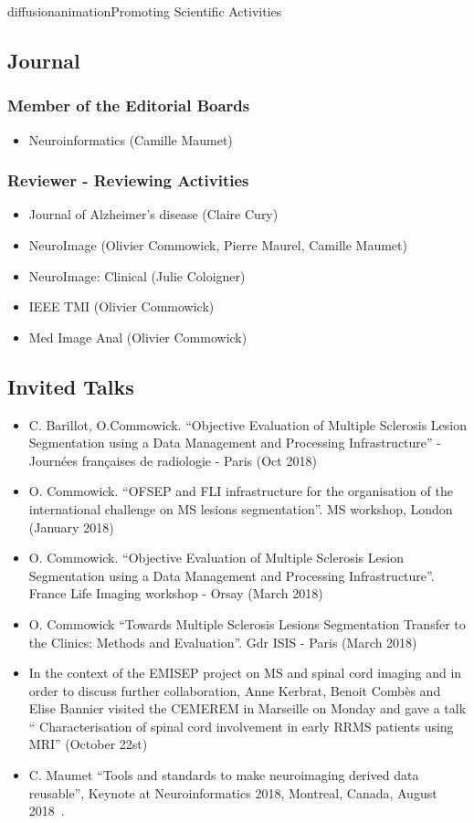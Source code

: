 \documentclass{ra2018}
\begin{document}
\begin{module}{diffusion}{animation}{Promoting Scientific Activities}
\subsection{Journal}
    \subsubsection{Member of the Editorial Boards}
    \begin{itemize}
        \item Neuroinformatics (Camille Maumet)
    \end{itemize}   
    \subsubsection{Reviewer - Reviewing Activities}
    \begin{itemize}
        \item Journal of Alzheimer's disease (Claire Cury)
        \item NeuroImage (Olivier Commowick, Pierre Maurel, Camille Maumet)
        \item NeuroImage: Clinical (Julie Coloigner)
        \item IEEE TMI (Olivier Commowick)
        \item Med Image Anal (Olivier Commowick)
    \end{itemize}    
\subsection{Invited Talks}
\begin{itemize}
    \item C. Barillot, O.Commowick. ``Objective Evaluation of Multiple Sclerosis Lesion Segmentation using a Data Management and Processing Infrastructure'' - Journées françaises de radiologie - Paris (Oct 2018)~\cite{commowick:inserm-01895603}
    \item O. Commowick. ``OFSEP and FLI infrastructure for the organisation of the international challenge on MS lesions segmentation''. MS workshop, London (January 2018)
    \item O. Commowick. ``Objective Evaluation of Multiple Sclerosis Lesion Segmentation using a Data Management and Processing Infrastructure''. France Life Imaging workshop - Orsay (March 2018)
    \item O. Commowick ``Towards Multiple Sclerosis Lesions Segmentation Transfer to the Clinics: Methods and Evaluation''. Gdr ISIS - Paris (March 2018)
    \item In the context of the EMISEP project on MS and spinal cord imaging and in order to discuss further collaboration, Anne Kerbrat, Benoit Combès and Elise Bannier visited the CEMEREM in Marseille on Monday and gave a talk `` Characterisation of spinal cord involvement in early RRMS patients using MRI'' (October 22st)
    \item C. Maumet ``Tools and standards to make neuroimaging derived data reusable'', Keynote at Neuroinformatics 2018, Montreal, Canada, August 2018~\cite{maumet:inserm-01886089}.
\end{itemize}



\end{module}
\end{document}
